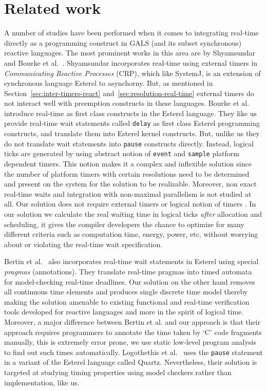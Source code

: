 \section{Related work}
\label{sec:related-work}


A number of studies have been performed when it comes to integrating
real-time directly as a programming construct in GALS (and its subset
synchronous) reactive languages. The most prominent works in this area
are by Shyamsundar~\cite{rsh94} and Bourke et al.~\cite{Bourke2009a}.
Shyamsundar incorporates real-time using external timers in
\textit{Communicating Reactive Processes} (CRP), which like SystemJ, is
an extension of synchronous language Esterel to asynchorny. But, as
mentioned in Section~\ref{sec:inter-timers-react}
and~\ref{sec:resolution-real-time} external timers do not interact well
with preemption constructs in these languages. Bourke et al. introduce
real-time as first class constructs in the Esterel language. They like
us provide real-time wait statements called \texttt{delay} as first
class Esterel programming constructs, and translate them into Esterel
kernel constructs. But, unlike us they do not translate wait statements
into \texttt{pause} constructs directly. Instead, logical ticks are
generated by using abstract notion of \texttt{event} and \texttt{sample}
platform dependent timers. This notion makes it a complex and inflexible
solution since the number of platform timers with certain resolutions
need to be determined and present on the system for the solution to be
realizable. Moreover, non exact real-time waits and integration with
non-maximal parallelism is not studied at all. Our solution does not
require external timers \cite{rsh94} or logical notion of timers
\cite{Bourke2009a}. In our solution we calculate the real waiting time
in logical ticks \textit{after} allocation and scheduling, it gives the
compiler developers the chance to optimize for many different criteria
such as computation time, energy, power, etc, without worrying about or
violating the real-time wait specification.


Bertin et al.~\cite{Bertin:2000:TVR:1947412.1947439} also incorporates
real-time wait statements in Esterel using special \textit{pragmas}
(annotations). They translate real-time pragmas into timed
automata~\cite{alur94} for model-checking real-time deadlines. Our
solution on the other hand removes all continuous time elements and
produces single discrete time model thereby making the solution amenable
to existing functional and real-time verification tools developed for
reactive languages and more in the spirit of logical time. Moreover, a
major difference between Bertin et al. and our approach is that their
approach requires programmers to annotate the time taken by `C' code
fragments manually, this is extremely error prone, we use static
low-level program analysis to find out such times automatically.
Logothethis et al.~\cite{glog02} uses the \texttt{pause} statement in a
variant of the Esterel language called Quartz. Nevertheless, their
solution is targeted at studying timing properties using model checkers
rather than implementation, like us.


